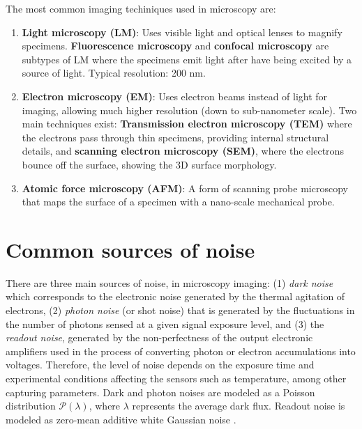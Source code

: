 \documentclass{article}
\begin{document}
The most common imaging techiniques used in microscopy are:

\begin{enumerate}
\item \textbf{Light microscopy (LM)}: Uses visible light and optical
  lenses to magnify specimens. \textbf{Fluorescence microscopy} and
  \textbf{confocal microscopy} are subtypes of LM where the specimens emit
  light after have being excited by a source of light. Typical
  resolution: 200 nm.
\item \textbf {Electron microscopy (EM)}: Uses electron beams instead
  of light for imaging, allowing much higher resolution (down to
  sub-nanometer scale). Two main techniques exist:
  \textbf{Transmission electron microscopy (TEM)} where the electrons
  pass through thin specimens, providing internal structural details,
  and \textbf{scanning electron microscopy (SEM)}, where the electrons
  bounce off the surface, showing the 3D surface morphology.
\item \textbf{Atomic force microscopy (AFM)}: A form of scanning probe
  microscopy that maps the surface of a specimen with a nano-scale
  mechanical probe.
\end{enumerate}


\section{Common sources of noise}

There are three main sources of noise, in microscopy imaging: (1)
\emph{dark noise} which corresponds to the electronic noise generated
by the thermal agitation of electrons, (2) \emph{photon noise} (or
shot noise) that is generated by the fluctuations in the number of
photons sensed at a given signal exposure level, and (3) the
\emph{readout noise}, generated by the non-perfectness of the output
electronic amplifiers used in the process of converting photon or
electron accumulations into voltages. Therefore, the level of noise
depends on the exposure time and experimental conditions affecting the
sensors such as temperature, among other capturing parameters. Dark
and photon noises are modeled as a Poisson distribution
$\mathcal{P}(\lambda)$, where $\lambda$ represents the average dark
flux. Readout noise is modeled as zero-mean additive white Gaussian
noise \cite{meiniel2018denoising,zhou2020wirtinger}.
\end{document}
